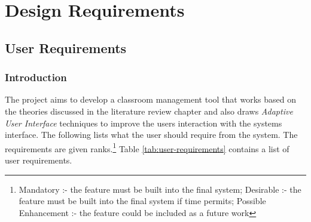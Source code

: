 \section{Design Requirements} \label{sec:designRequirements}
\subsection{User Requirements} \label{sub:userRequirments}
\subsubsection{Introduction}
The project aims to develop a classroom management tool that works based on the theories discussed in the literature review chapter and also draws \emph{Adaptive User Interface} techniques to improve the users interaction with the systems interface. The following lists what the user should require from the system. The requirements are given ranks.\footnote{ Mandatory :- the feature must be built into the final system; Desirable :- the feature must be built into the final system if time permits; Possible Enhancement :- the feature could be included as a future work} Table \ref{tab:user-requirements} contains a list of user requirements.
